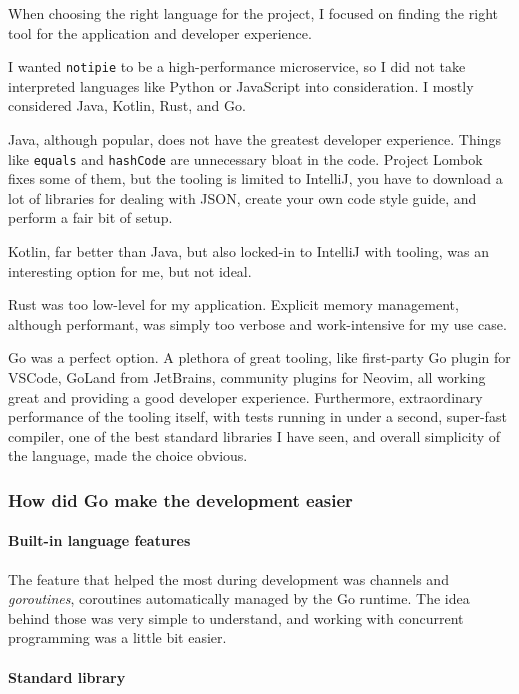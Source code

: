 When choosing the right language for the project, I focused on finding
the right tool for the application and developer experience.

I wanted \texttt{notipie} to be a high-performance microservice, so I
did not take interpreted languages like Python or JavaScript into
consideration. I mostly considered Java, Kotlin, Rust, and Go.

Java, although popular, does not have the greatest developer experience.
Things like \texttt{equals} and \texttt{hashCode} are unnecessary bloat
in the code. Project Lombok fixes some of them, but the tooling is
limited to IntelliJ, you have to download a lot of libraries for dealing
with JSON, create your own code style guide, and perform a fair bit of
setup.

Kotlin, far better than Java, but also locked-in to IntelliJ with
tooling, was an interesting option for me, but not ideal.

Rust was too low-level for my application. Explicit memory management,
although performant, was simply too verbose and work-intensive for my
use case.

Go was a perfect option. A plethora of great tooling, like first-party
Go plugin for VSCode, GoLand from JetBrains, community plugins for
Neovim, all working great and providing a good developer experience.
Furthermore, extraordinary performance of the tooling itself, with tests
running in under a second, super-fast compiler, one of the best standard
libraries I have seen, and overall simplicity of the language, made the
choice obvious.

\subsubsection{How did Go make the development easier}\label{how-did-go-make-the-development-easier}

\paragraph{Built-in language features}\label{built-in-language-features}

The feature that helped the most during development was channels and
\emph{goroutines}, coroutines automatically managed by the Go runtime.
The idea behind those was very simple to understand, and working with
concurrent programming was a little bit easier.

\paragraph{Standard library}\label{standard-library}

